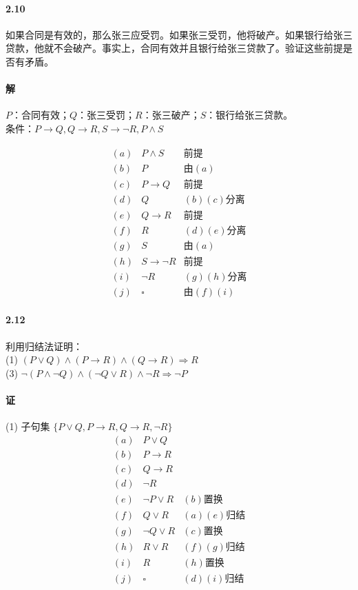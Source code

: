 \documentclass[hyperref, UTF8]{ctexart}
\begin{document}
\paragraph{2.10}\label{2.10}
如果合同是有效的，那么张三应受罚。如果张三受罚，他将破产。如果银行给张三贷款，他就不会破产。事实上，合同有效并且银行给张三贷款了。验证这些前提是否有矛盾。

\paragraph{解}
$P$：合同有效；$Q$：张三受罚；$R$：张三破产；$S$：银行给张三贷款。\\

条件：$ P \rightarrow Q, Q \rightarrow R, S \rightarrow \lnot R, P \land S $ 

\begin{align*}
(a) & P \land S & \text{前提} \\
(b) & P & \text{由}(a) \\
(c) & P \to Q & \text{前提} \\
(d) & Q & (b)(c)\text{分离} \\
(e) & Q \to R & \text{前提} \\
(f) & R & (d)(e)\text{分离} \\
(g) & S & \text{由}(a) \\
(h) & S \to \lnot R & \text{前提} \\
(i) & \lnot R & (g)(h)\text{分离} \\
(j) & \square & \text{由}(f)(i) 
\end{align*}

\paragraph{2.12}\label{2.12}
利用归结法证明：\\

(1) $ (P \lor Q) \land (P \rightarrow R) \land (Q \rightarrow R) \Rightarrow R $ \\

(3) $ \lnot (P \land \lnot Q) \land ( \lnot Q \lor R) \land \lnot R \Rightarrow \lnot P $

\paragraph{证}

(1) 子句集 $ \{ P \lor Q, P \rightarrow R, Q \rightarrow R, \lnot R \} $
\begin{align*}
(a) & P \lor Q \\
(b) & P \to R \\
(c) & Q \to R \\
(d) & \lnot R \\
(e) & \lnot P \lor R & (b)\text{置换} \\
(f) & Q \lor R & (a)(e)\text{归结} \\
(g) & \lnot Q \lor R & (c)\text{置换} \\
(h) & R \lor R & (f)(g)\text{归结} \\
(i) & R & (h)\text{置换} \\
(j) & \square & (d)(i)\text{归结}  
\end{align*}
\end{document}
